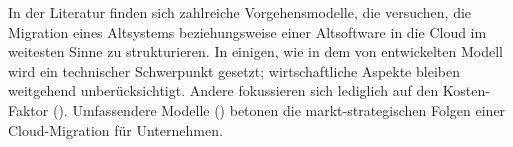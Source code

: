 \begin{comment}
Als SaaS-Vertriebsplattform soll in dieser Arbeit schwerpunktmäßig Salesforce 
betrachtet werden, das mit "`AppExchange"' einen Marktplatz zur Verfügung 
stellt, auf dem Hersteller ihre auf der Salesforceplattform laufenden 
Anwendungen anbieten können. Die Konzentration auf Salesforce als Zielplattform 
war zum einen durch das Unternehmen gegeben, mit dem in freundlicher 
Kooperation diese Thesis entstanden ist.

\begin{figure}[bh]
\begin{center}
\begin{tikzpicture}
\begin{axis}[
/pgf/number format/.cd,
        use comma,
        1000 sep={},
    title={Umsatz von Salesforce in Mio. US-Dollar},
    xlabel={Jahr},
    ymin=0, ymax=8000,
    legend pos=north west,
    ymajorgrids=true,
    grid style=dashed
]

\addplot[color=blue,mark=square,]
    coordinates {
    (2012,2267)(2013,3050)(2014,4071)(2015,5374)(2016,6667)
    };
 
\end{axis}
\end{tikzpicture}
\caption{Umsatzzahlen entnommen aus \cite[43]{salesforceannualreport} }
\label{UmsatzzahlenSalesforce}
\end{center}
\end{figure}
Zum anderen aber gehört Salesforce neben Microsoft 
und Google zu den größten SaaS-Anbietern
\pcite{}{247}{softwareindustrie2015} und konnte zwischen 2012 und 2016 
den Umsatz mit durchschnittlich 31\% von 2,267 Milliarden US-Dollar auf 
6,667 Milliarden US-Dollar rasant steigern (Vgl. Abbildung 
~\ref{UmsatzzahlenSalesforce}). Daher dürfte es als Zielplattform für 
viele Unternehmen eine Option sein.
\end{comment}

In der Literatur finden sich zahlreiche Vorgehensmodelle, die 
versuchen, die Migration eines Altsystems beziehungsweise einer Altsoftware 
in die Cloud im 
weitesten Sinne zu strukturieren. In einigen, wie in dem von 
 entwickelten Modell wird 
ein technischer Schwerpunkt gesetzt; wirtschaftliche Aspekte bleiben weitgehend 
unberücksichtigt. Andere fokussieren sich lediglich auf den Kosten-Faktor 
(). Umfassendere Modelle 
() betonen die 
markt-strategischen Folgen einer Cloud-Migration für Unternehmen. 

